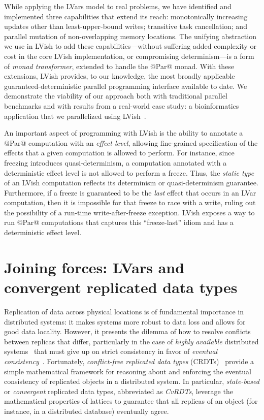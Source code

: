 \documentclass{article}
\begin{document}
While applying the LVars model to real problems, we have identified
and implemented three capabilities that extend its reach:
monotonically increasing updates other than least-upper-bound writes;
transitive task cancellation; and parallel mutation of non-overlapping
memory locations. The unifying abstraction we use in LVish to add
these capabilities---without suffering added complexity or cost in the
core LVish implementation, or compromising determinism---is a form of
\emph{monad transformer}, extended to handle the @Par@ monad.  With
these extensions, LVish provides, to our knowledge, the most broadly
applicable guaranteed-deterministic parallel programming interface
available to date. We demonstrate the viability of our approach both
with traditional parallel benchmarks and with results from a
real-world case study: a bioinformatics application that we
parallelized using LVish~\cite{phybin}.

An important aspect of programming with LVish is the ability to
annotate a @Par@ computation with an \emph{effect level}, allowing
fine-grained specification of the effects that a given computation is
allowed to perform.  For instance, since freezing introduces
quasi-determinism, a computation annotated with a deterministic effect
level is not allowed to perform a freeze.  Thus, the \emph{static
  type} of an LVish computation reflects its determinism or
quasi-determinism guarantee.  Furthermore, if a freeze is guaranteed
to be the \emph{last} effect that occurs in an LVar computation, then
it is impossible for that freeze to race with a write, ruling out the
possibility of a run-time write-after-freeze exception.  LVish exposes
a way to run @Par@ computations that captures this ``freeze-last''
idiom and has a deterministic effect level.

\section{Joining forces: LVars and convergent replicated data types}\label{crdts}

Replication of data across physical locations is of fundamental
importance in distributed systems: it makes systems more robust to
data loss and allows for good data locality.  However, it presents the
dilemma of how to resolve conflicts between replicas that differ,
particularly in the case of \emph{highly available} distributed
systems~\cite{dynamo} that must give up on strict consistency in favor
of \emph{eventual consistency}~\cite{vogels-ec}.  Fortunately,
\emph{conflict-free replicated data types} (CRDTs)~\cite{crdts}
provide a simple mathematical framework for reasoning about and
enforcing the eventual consistency of replicated objects in a
distributed system.  In particular, \emph{state-based} or
\emph{convergent} replicated data types, abbreviated as \emph{CvRDTs},
leverage the mathematical properties of lattices to guarantee that all
replicas of an object (for instance, in a distributed database)
eventually agree.
\end{document}
